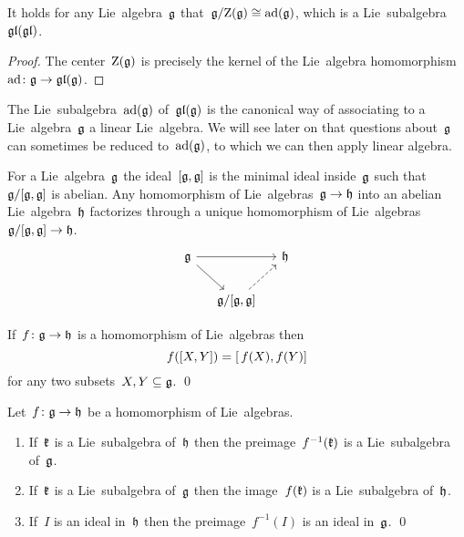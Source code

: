 \begin{corollary}
  It holds for any Lie~algebra~$\mathfrak{g}$ that~$\mathfrak{g}/{\operatorname{Z}(\mathfrak{g})} \cong \operatorname{ad}(\mathfrak{g})$, which is a Lie~subalgebra~$\mathfrak{gl}(\mathfrak{gl})$.
\end{corollary}


\begin{proof}
  The center~$\operatorname{Z}(\mathfrak{g})$ is precisely the kernel of the Lie~algebra homomorphism~$\operatorname{ad} \colon \mathfrak{g} \to \mathfrak{gl}(\mathfrak{g})$.
\end{proof}


\begin{remark}
  The Lie~subalgebra~$\operatorname{ad}(\mathfrak{g})$ of~$\mathfrak{gl}(\mathfrak{g})$ is the canonical way of associating to a Lie~algebra~$\mathfrak{g}$ a linear Lie~algebra.
  We will see later on that questions about~$\mathfrak{g}$ can sometimes be reduced to~$\operatorname{ad}(\mathfrak{g})$, to which we can then apply linear algebra.
\end{remark}


\begin{remark}
  For a Lie~algebra~$\mathfrak{g}$ the ideal~$[\mathfrak{g},\mathfrak{g}]$ is the minimal ideal inside~$\mathfrak{g}$ such that~$\mathfrak{g}/[\mathfrak{g},\mathfrak{g}]$ is abelian.
  Any homomorphism of Lie~algebras~$\mathfrak{g} \to \mathfrak{h}$ into an abelian Lie~algebra~$\mathfrak{h}$ factorizes through a unique homomorphism of Lie~algebras~$\mathfrak{g}/[\mathfrak{g}, \mathfrak{g}] \to \mathfrak{h}$.
  \[
    \begin{tikzcd}[column sep = small]
      \glie
      \arrow{rr}
      \arrow{dr}
      &
      {}
      &
      \hlie
      \\
      {}
      &
      \glie/[\glie,\glie]
      \arrow[dashed]{ur}
      &
      {}
    \end{tikzcd}
  \]
\end{remark}


\begin{lemma}
  \label{homomorphisms respect commutators of sets}
  If~$f \colon \mathfrak{g} \to \mathfrak{h}$ is a homomorphism of Lie~algebras then
  \[
    f([X,Y])
    =
    [\, f(X), f(Y)]
  \]
  for any two subsets~$X, Y \subseteq \mathfrak{g}$.
  \qed
\end{lemma}


\begin{lemma}
  Let~$f \colon \mathfrak{g} \to \mathfrak{h}$ be a homomorphism of Lie~algebras.
  \begin{enumerate}
    \item
      If~$\mathfrak{k}$ is a Lie~subalgebra of~$\mathfrak{h}$ then the preimage~$f^{-1}(\mathfrak{k})$ is a Lie~subalgebra of~$\mathfrak{g}$.
    \item
      If~$\mathfrak{k}$ is a Lie~subalgebra of~$\mathfrak{g}$ then the image~$f(\mathfrak{k})$ is a Lie~subalgebra of~$\mathfrak{h}$.
    \item
      If~$I$ is an ideal in~$\mathfrak{h}$ then the preimage~$f^{-1}(I)$ is an ideal in~$\mathfrak{g}$.
    \qed
  \end{enumerate}
\end{lemma}


